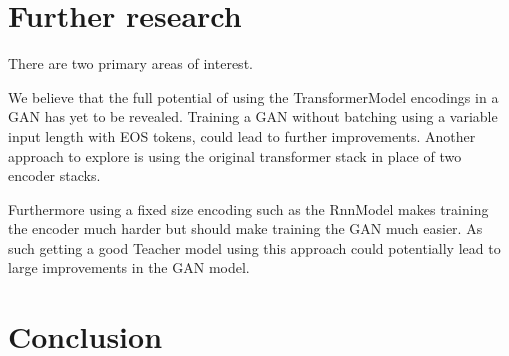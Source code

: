 \documentclass{article}
\begin{document}
\section{Further research}\label{sec:furtherResearch}
There are two primary areas of interest.

We believe that the full potential of using the TransformerModel encodings
in a GAN has yet to be revealed. Training a GAN without batching using a variable
input length with EOS tokens, could lead to further improvements. Another approach
to explore is using the original transformer stack in place of two encoder stacks.

Furthermore using a fixed size encoding such as the RnnModel makes training the encoder much harder
but should make training the GAN much easier. As such getting a good Teacher model using this
approach could potentially lead to large improvements in the GAN model.

\section{Conclusion}\label{sec:conclusion}


\newpage
\printbibliography%
\end{document}

